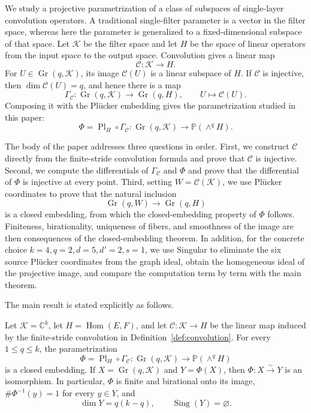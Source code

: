 \documentclass{siamonline250211}
\newcommand{\CC}{\mathbb C}
\newcommand{\PP}{\mathbb P}
\newcommand{\Gr}{\operatorname{Gr}}
\newcommand{\Pl}{\operatorname{Pl}}
\newcommand{\Hom}{\operatorname{Hom}}
\newcommand{\Sing}{\operatorname{Sing}}
\newcommand{\cK}{\mathcal K}
\newcommand{\cC}{\mathcal C}
\begin{document}
We study a projective parametrization of a class of subspaces of single-layer
convolution operators. A traditional single-filter parameter is a vector in the
filter space, whereas here the parameter is generalized to a fixed-dimensional
subspace of that space. Let $\cK$ be the filter space and let $H$ be the space of
linear operators from the input space to the output space. Convolution gives a
linear map
\[
  \cC:\cK\longrightarrow H.
\]
For $U\in\Gr(q,\cK)$, its image $\cC(U)$ is a linear subspace of $H$. If $\cC$
is injective, then $\dim\cC(U)=q$, and hence there is a map
\[
  \Gamma_{\cC}:\Gr(q,\cK)\longrightarrow\Gr(q,H),
  \qquad U\longmapsto\cC(U).
\]
Composing it with the Pl\"ucker embedding gives the parametrization studied in
this paper:
\[
  \Phi=\Pl_H\circ\Gamma_{\cC}:
  \Gr(q,\cK)\longrightarrow\PP(\wedge^qH).
\]

The body of the paper addresses three questions in order. First, we construct
$\cC$ directly from the finite-stride convolution formula and prove that $\cC$
is injective. Second, we compute the differentials of $\Gamma_{\cC}$ and $\Phi$
and prove that the differential of $\Phi$ is injective at every point. Third,
setting $W=\cC(\cK)$, we use Pl\"ucker coordinates to prove that the natural
inclusion
\[
  \Gr(q,W)\longrightarrow\Gr(q,H)
\]
is a closed embedding, from which the closed-embedding property of $\Phi$
follows. Finiteness, birationality, uniqueness of fibers, and smoothness of the
image are then consequences of the closed-embedding theorem.
In addition, for the concrete choice $k=4,q=2,d=5,d'=2,s=1$, we use Singular
to eliminate the six source Pl\"ucker coordinates from the graph ideal, obtain
the homogeneous ideal of the projective image, and compare the computation
term by term with the main theorem.

The main result is stated explicitly as follows.

\begin{theorem}\label{thm:main}
Let $\cK=\CC^k$, let $H=\Hom(E,F)$, and let
$\cC:\cK\to H$ be the linear map induced by the finite-stride convolution in
Definition~\ref{def:convolution}. For every $1\leq q\leq k$, the parametrization
\[
  \Phi=\Pl_H\circ\Gamma_{\cC}:
  \Gr(q,\cK)\longrightarrow\PP(\wedge^qH)
\]
is a closed embedding. If $X=\Gr(q,\cK)$ and $Y=\Phi(X)$, then
$\Phi:X\xrightarrow{\sim}Y$ is an isomorphism. In particular, $\Phi$ is finite
and birational onto its image, $\#\Phi^{-1}(y)=1$ for every $y\in Y$, and
\[
  \dim Y=q(k-q),\qquad \Sing(Y)=\varnothing.
\]
\end{theorem}
\end{document}

